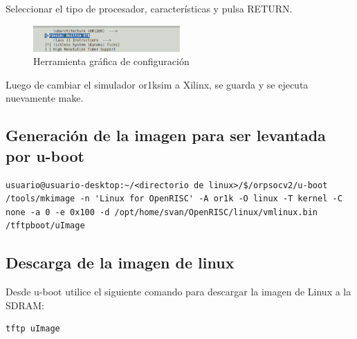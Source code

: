 Seleccionar el tipo de procesador, características y pulsa RETURN. 
\begin{figure}[h!]
 \begin{center}
  \includegraphics[width=0.5\textwidth,keepaspectratio=true]{./images/tipoprocesador}
  \caption{Herramienta gráfica de configuración}
 \end{center}
\end{figure}
  
Luego de cambiar el simulador or1ksim a Xilinx, se guarda y se ejecuta nuevamente make.

\subsection{Generación de la imagen para ser levantada por u-boot}
\begin{lstlisting}[breaklines]
usuario@usuario-desktop:~/<directorio de linux>/$/orpsocv2/u-boot /tools/mkimage -n 'Linux for OpenRISC' -A or1k -O linux -T kernel -C none -a 0 -e 0x100 -d /opt/home/svan/OpenRISC/linux/vmlinux.bin /tftpboot/uImage
\end{lstlisting}

\subsection{Descarga de la imagen de linux}

Desde u-boot utilice el siguiente comando para descargar la imagen de Linux a la SDRAM:

\begin{lstlisting}[breaklines]
tftp uImage
\end{lstlisting}


